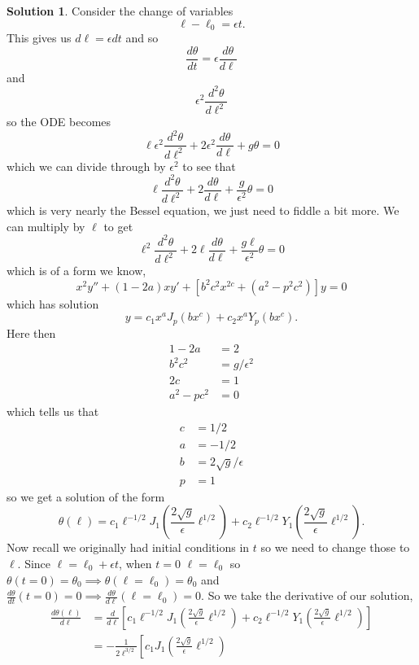 \documentclass[10pt]{article}
\theoremstyle{definition}
\newtheorem{soln}{Solution}
\begin{document}
\begin{soln}
  Consider the change of variables
  $$\ell-\ell_0=\epsilon t.$$ This gives us
  $d\ell=\epsilon dt$
  and so
  $$\frac{d\theta}{dt}=\epsilon\frac{d\theta}{d\ell}$$ and
  $$\epsilon^2\frac{d^2\theta}{d\ell^2}$$
  so the ODE becomes
  $$\ell \epsilon^2\frac{d^2\theta}{d\ell^2}+2\epsilon^2\frac{d\theta}{d\ell}+g\theta=0$$
  which we can divide through by $\epsilon^2$ to see that
  $$\ell\frac{d^2\theta}{d\ell^2}+2\frac{d\theta}{d\ell}+\frac{g}{\epsilon^2}\theta=0$$
  which is very nearly the Bessel equation, we just need to fiddle a bit more. We can multiply by $\ell$ to get
  $$\ell^2\frac{d^2\theta}{d\ell^2}+2\ell\frac{d\theta}{d\ell}+\frac{g\ell}{\epsilon^2}\theta=0$$
  which is of a form we know,
  $$x^2y''+(1-2a)xy'+\left[b^2c^2x^{2c}+(a^2-p^2c^2)\right]y=0$$
  which has solution
  $$y=c_1x^aJ_p(bx^c)+c_2x^aY_p(bx^c).$$
  Here then
  \begin{align*}
    1-2a     & =2            \\
    b^2c^2   & =g/\epsilon^2 \\
    2c       & =1            \\
    a^2-pc^2 & =0
  \end{align*}
  which tells us that
  \begin{align*}
    c & =1/2                \\
    a & =-1/2               \\
    b & =2\sqrt{g}/\epsilon \\
    p & =1
  \end{align*}
  so we get a solution of the form
  $$\theta(\ell)=c_1\ell^{-1/2}J_1\left(\frac{2\sqrt{g}}{\epsilon}\ell^{1/2}\right)+c_2\ell^{-1/2}Y_1\left(\frac{2\sqrt{g}}{\epsilon}\ell^{1/2}\right).$$
  Now recall we originally had initial conditions in $t$ so we need to change those to $\ell$.
  Since $\ell=\ell_0+\epsilon t$, when $t=0$ $\ell=\ell_0$ so $\theta(t=0)=\theta_0\implies \theta(\ell=\ell_0)=\theta_0$
  and $\frac{d\theta}{dt}(t=0)=0\implies \frac{d\theta}{d\ell}(\ell=\ell_0)=0$.
  So we take the derivative of our solution,
  \begin{align*}
    \frac{d\theta(\ell)}{d\ell} & =\frac{d}{d\ell}\left[
      c_1\ell^{-1/2}J_1\left(\frac{2\sqrt{g}}{\epsilon}\ell^{1/2}\right)
      +c_2\ell^{-1/2}Y_1\left(\frac{2\sqrt{g}}{\epsilon}\ell^{1/2}\right)
    \right]                                                     \\
                                & =-\frac{1}{2\ell^{3/2}}\left[
      c_1J_1\left(\frac{2\sqrt{g}}{\epsilon}\ell^{1/2}\right)

\end{align*}
\end{soln}
\end{document}
